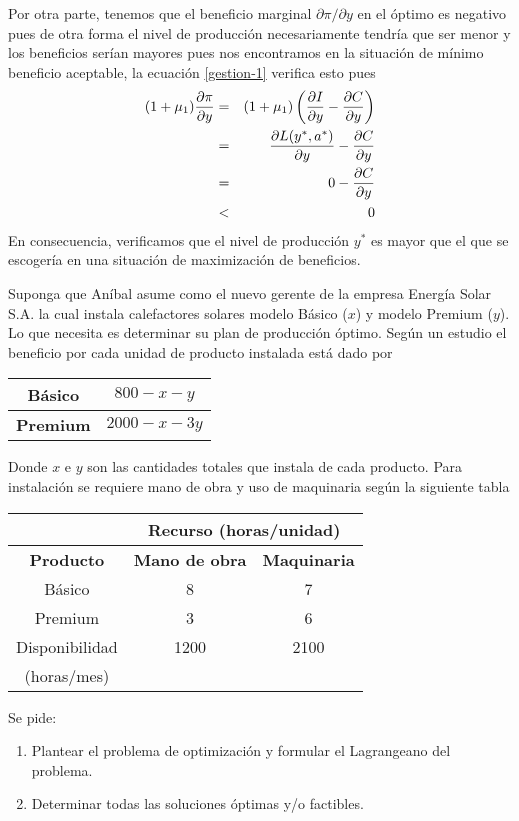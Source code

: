 \begin{solucion}
Por otra parte, tenemos que el beneficio marginal $\partial \pi / \partial y$ en el \'optimo es negativo pues de otra forma el nivel de producci\'on necesariamente tendr\'ia que ser menor y los beneficios ser\'ian mayores pues nos encontramos en la situaci\'on de m\'inimo beneficio aceptable, la ecuaci\'on \eqref{gestion-1} verifica esto pues
\begin{eqnarray*}
(1+\mu_1)\frac{\partial \pi}{\partial y} &=& (1+\mu_1)\left(\frac{\partial I}{\partial y}-\frac{\partial C}{\partial y}\right) \\
&=& \frac{\partial L(y^*,a^*)}{\partial y} - \frac{\partial C}{\partial y} \\
&=& 0 - \frac{\partial C}{\partial y} \\
&<& 0
\end{eqnarray*}
En consecuencia, verificamos que el nivel de producci\'on $y^*$ es mayor que el que se escoger\'ia en una situaci\'on de maximizaci\'on de beneficios.
\end{solucion}

\begin{ejemplo}\label{ejemplo-produccion}
Suponga que An\'ibal asume como el nuevo gerente de la empresa Energ\'ia Solar S.A. la cual  instala calefactores solares modelo B\'asico ($x$) y modelo Premium ($y$). Lo que necesita es determinar su plan de producci\'on \'optimo. Seg\'un un estudio el beneficio por cada unidad de producto instalada est\'a dado por

\begin{center} \begin{tabular}{|c|c|} \hline
\textbf{B\'asico} & $800-x-y$  \\ \hline
\textbf{Premium}  & $2000-x-3y$   \\ \hline
\end{tabular} 
\end{center}

Donde $x$ e $y$ son las cantidades totales que instala de cada producto.
Para instalaci\'on se requiere mano de obra y uso de maquinaria seg\'un la siguiente tabla

\begin{center} \begin{tabular}{|c|c|c|} \hline
 				  & \multicolumn{2}{c|}{\textbf{Recurso (horas/unidad)}}  	\\ \hline 
\textbf{Producto} & \textbf{Mano de obra} & \textbf{Maquinaria} 			\\ \hline 
B\'asico 		  & 8				& 7 		 							\\ \hline 
Premium  		  & 3				& 6 									\\ \hline
Disponibilidad    & 1200			& 2100		 							\\
(horas/mes)		  &					&			 							\\ \hline
\end{tabular} \end{center}

Se pide:
\begin{enumerate}
\item Plantear el problema de optimizaci\'on y formular el Lagrangeano del problema.
\item Determinar todas las soluciones \'optimas y/o factibles.
\end{enumerate}
\end{ejemplo}


